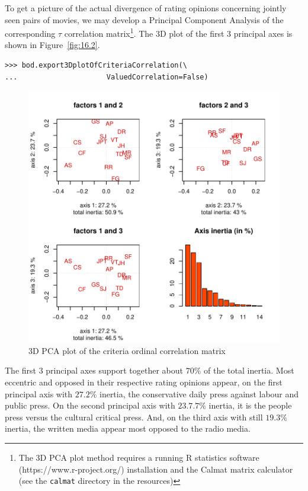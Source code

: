 To get a picture of the actual divergence of rating opinions concerning jointly seen pairs of movies, we may develop a Principal Component Analysis of the corresponding $\tau$ correlation matrix\footnote{The 3D PCA plot method requires a running R statistics software  (https://www.r-project.org/) installation and the Calmat matrix calculator (see the \texttt{calmat} directory in the \Digraph resources)}. The 3D plot of the first 3 principal axes is shown in Figure~\vref{fig:16.2}.
\begin{lstlisting}
>>> bod.export3DplotOfCriteriaCorrelation(\
...                     ValuedCorrelation=False)
\end{lstlisting}
\begin{figure}[ht]
\includegraphics[width=\hsize]{Figures/16-4-correlationPCA.pdf}
\caption{3D PCA plot of the criteria ordinal correlation matrix}
\label{fig:16.4}       %
\end{figure}

The first 3 principal axes support together about $70\%$ of the total inertia. Most eccentric and opposed in their respective rating opinions appear, on the first principal axis with $27.2\%$ inertia, the conservative daily press against labour and public press. On the second principal axis with $23.7.7\%$ inertia, it is the people press versus the cultural critical press. And, on the third axis with still $19.3\%$ inertia, the written media appear most opposed to the radio media.

